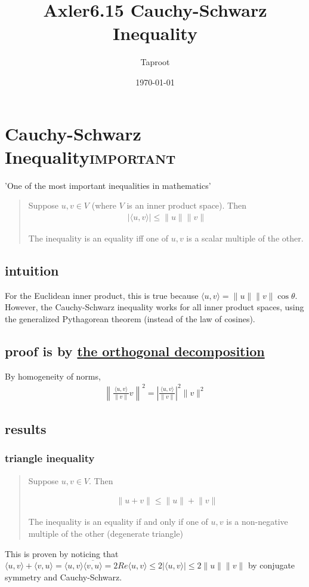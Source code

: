 \documentclass[letterpaper]{article}
\author{Taproot}
\date{\today}
\title{Axler6.15 Cauchy-Schwarz Inequality}
\renewcommand{\tableofcontents}{}
\begin{document}
\tableofcontents

\section{Cauchy-Schwarz Inequality\hfill{}\textsc{important}}
\label{sec:orgf86e3d3}
'One of the most important inequalities in mathematics'
\begin{quote}
Suppose \(u, v \in V\) (where \(V\) is an inner product space). Then
\[\begin{aligned}
  \vert \langle u, v \rangle \vert \leq \lVert u \rVert \lVert v \rVert
  \end{aligned}\]

The inequality is an equality iff one of \(u, v\) is a scalar multiple of the other.
\end{quote}

\subsection{intuition}
\label{sec:org167c032}
For the Euclidean inner product, this is true because \(\langle u, v \rangle = \lVert u \rVert \lVert v \rVert \cos \theta\). However, the Cauchy-Schwarz inequality works for all inner product spaces, using the generalized Pythagorean theorem (instead of the law of cosines).
\subsection{proof is by \href{KBrefOrthogonalDecomposition.org}{the orthogonal decomposition}}
\label{sec:org4c008a4}

By homogeneity of norms,
\[\begin{aligned}
   \left\lVert \frac{ \langle u, v \rangle }{\lVert v \rVert} v \right\rVert ^2 = \left| \frac{ \langle u, v \rangle }{\lVert v \rVert}\right|^2 \lVert v \rVert ^2
   \end{aligned}\]

\subsection{results}
\label{sec:org9db376e}
\subsubsection{triangle inequality}
\label{sec:org63912d7}
\begin{quote}
Suppose \(u, v \in V\). Then

\[\begin{aligned}
    \lVert u+v \rVert \leq \lVert u \rVert + \lVert v \rVert
	\end{aligned}\]

The inequality is an equality if and only if one of \(u, v\) is a non-negative multiple of the other (degenerate triangle)
\end{quote}
This is proven by noticing that \(\langle u, v \rangle + \langle  v, u \rangle = \langle  u, v \rangle \overline{\langle v, u \rangle} = 2 Re \langle u, v \rangle \leq  2|\langle u, v \rangle| \leq 2\lVert u \rVert \lVert v \rVert\) by conjugate symmetry and Cauchy-Schwarz.
\end{document}
